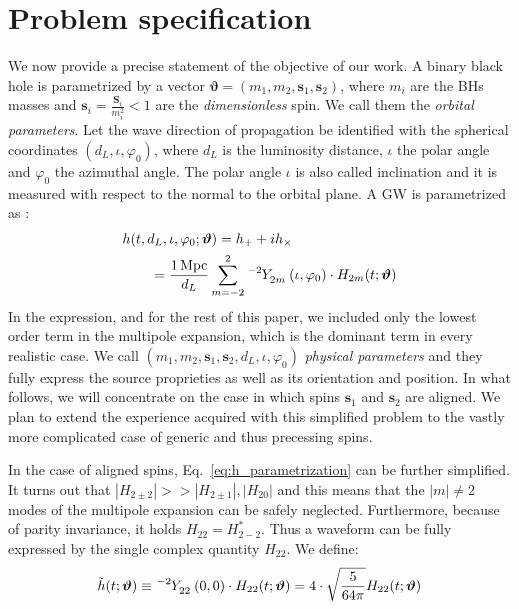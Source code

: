 \section{Problem specification}
We now provide a precise statement of the objective of our work.
A binary black hole is parametrized by a vector $ \boldsymbol{\vartheta} = (m_1,m_2, \mathbf{s}_1,\mathbf{s}_2) $, where $m_i$ are the BHs masses and $\mathbf{s}_i = \frac{\mathbf{S}_i}{m_i^2} <1$ are the \textit{dimensionless} spin. 
We call them the \textit{orbital parameters}.
Let the wave direction of propagation be identified with the spherical coordinates $(d_L, \iota, \varphi_0)$, where $d_L$ is the luminosity distance, $\iota$ the polar angle and $\varphi_0$ the azimuthal angle. The polar angle $\iota$ is also called inclination and it is measured with respect to the normal to the orbital plane.
A GW is parametrized as \cite{ajith2007dataformatsNRWF}:
\begin{align} \label{eq:h_parametrization}
	&h(t, d_L,\iota,\varphi_0; \boldsymbol{\vartheta}) = h_+ + i h_\times \nonumber \\
		&\qquad= {\frac{\SI{1}{Mpc}}{d_L}} \sum_{m = -2}^{2} \tensor[^{-2}]{Y}{_{2 m}}(\iota, \varphi_0) \cdot H_{2m}(t; \boldsymbol{\vartheta})
\end{align}
In the expression, and for the rest of this paper, we included only the lowest order term in the multipole expansion, which is the dominant term in every realistic case.
We call $(m_1,m_2, \mathbf{s}_1,\mathbf{s}_2, d_L,\iota,\varphi_0)$ \textit{physical parameters} and they fully express the source proprieties as well as its orientation and position.
In what follows, we will concentrate on the case in which spins $\mathbf{s}_1$ and $\mathbf{s}_2$ are aligned. We plan to extend the experience acquired with this simplified problem to the vastly more complicated case of generic and thus precessing spins.
\par
In the case of aligned spins, Eq.~\eqref{eq:h_parametrization} can be further simplified.
It turns out that $|H_{2\pm 2}| >> |H_{2\pm 1}|,|H_{20}|$ and this means that the $|m| \neq 2$ modes of the multipole expansion can be safely neglected.
Furthermore, because of parity invariance, it holds $H_{22} = H_{2 -2}^*$.
Thus a waveform can be fully expressed by the single complex quantity $H_{22}$. We define:
\begin{equation}\label{eq:h_std}
	\tilde{h}(t; \boldsymbol{\vartheta}) \equiv \tensor[^{-2}]{Y}{_{2 2}}(0,0) \cdot H_{22}(t; \boldsymbol{\vartheta}) = 4\cdot\sqrt{\frac{5}{64\pi}}H_{22}(t; \boldsymbol{\vartheta})
\end{equation}
